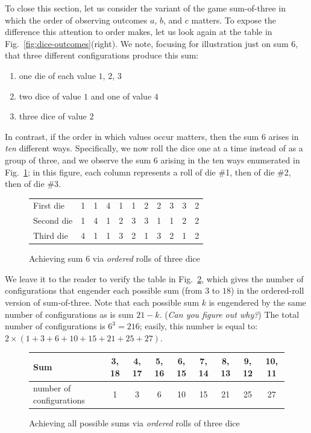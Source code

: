 \bigskip

To close this section, let us consider the variant of the game
sum-of-three in which the order of observing outcomes $a$, $b$, and
$c$ matters.  To expose the difference this attention to order makes,
let us look again at the table in Fig.~\ref{fig:dice-outcomes}(right).
We note, focusing for illustration just on sum $6$, that three
different configurations produce this sum:
\begin{enumerate}
\item one die of each value $1$, $2$, $3$
\item two dice of value $1$ and one of value $4$
\item three dice of value $2$
\end{enumerate}
In contrast, if the order in which values occur matters, then the
sum $6$ arises in {\em ten} different ways.  Specifically, we now
roll the dice one at a time instead of as a group of three, and we
observe the sum $6$ arising in the ten ways enumerated in
Fig.~\ref{fig:dice-ordered-outcomes}; in this figure, each column
represents a roll of die \#1, then of die \#2, then of die \#3.
\begin{figure}[htb]
\begin{center}
\begin{tabular}{|l||c|c|c|c|c|c|c|c|c|c|}
\hline
First die & 1 & 1 & 4 & 1 & 1 & 2 & 2 & 3 & 3 & 2   \\

Second die & 1 & 4 & 1 & 2 & 3 & 3 & 1 & 1 & 2 & 2   \\

Third die & 4 & 1 & 1 & 3 & 2 & 1 & 3 & 2 & 1 & 2  \\
\hline
\end{tabular}
\end{center}
\caption{Achieving sum $6$ via {\em ordered} rolls of three dice}
\label{fig:dice-ordered-outcomes}
\end{figure}

\medskip

We leave it to the reader to verify the table in
Fig.~\ref{fig:dice-ordered-configs}, which gives the number of
configurations that engender each possible sum (from $3$ to $18$) in
the ordered-roll version of sum-of-three.  Note that each possible sum
$k$ is engendered by the same number of configurations as is sum $21
- k$.  ({\em Can you figure out why?})  The total number of
configurations is $6^3 = 216$; easily, this number is equal to: $2
\times (1 + 3 + 6 + 10 + 15 + 21 + 25 + 27)$.
\begin{figure}[htb]
\begin{center}
\begin{tabular}{|l||c|c|c|c|c|c|c|c|}
\hline
Sum & 3, 18 & 4, 17 & 5, 16 & 6, 15 & 7, 14 & 8, 13 & 9, 12 & 10, 11  \\
\hline
number of configurations & 1 & 3 & 6 & 10 & 15 & 21 & 25 & 27  \\
\hline
\end{tabular}
\end{center}
\caption{Achieving all possible sums via {\em ordered} rolls of three dice}
\label{fig:dice-ordered-configs}
\end{figure}

